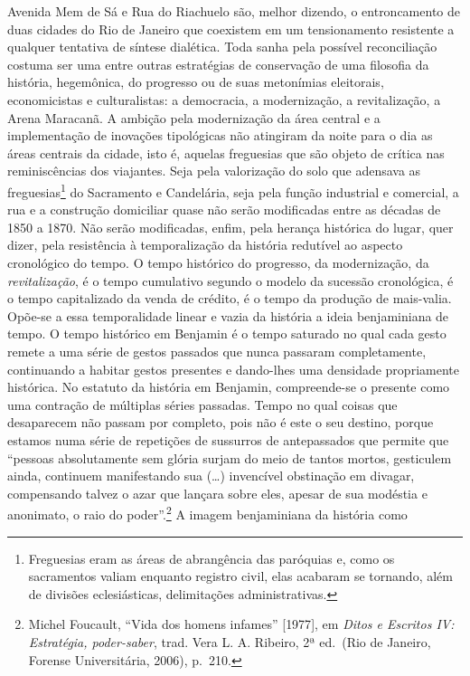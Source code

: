 Avenida Mem de Sá e Rua do Riachuelo são, melhor dizendo, o
entroncamento de duas cidades do Rio de Janeiro que coexistem em um
tensionamento resistente a qualquer tentativa de síntese dialética. Toda
sanha pela possível reconciliação costuma ser uma entre outras
estratégias de conservação de uma filosofia da história, hegemônica, do
progresso ou de suas metonímias eleitorais, economicistas e
culturalistas: a democracia, a modernização, a revitalização, a Arena
Maracanã. A ambição pela modernização da área central e a implementação
de inovações tipológicas não atingiram da noite para o dia as áreas
centrais da cidade, isto é, aquelas freguesias que são objeto de crítica
nas reminiscências dos viajantes. Seja pela valorização do solo que
adensava as freguesias\footnote{Freguesias eram as áreas de abrangência
  das paróquias e, como os sacramentos valiam enquanto registro civil,
  elas acabaram se tornando, além de divisões eclesiásticas,
  delimitações administrativas.} do Sacramento e Candelária, seja pela
função industrial e comercial, a rua e a construção domiciliar quase não
serão modificadas entre as décadas de 1850 a 1870. Não serão
modificadas, enfim, pela herança histórica do lugar, quer dizer, pela
resistência à temporalização da história redutível ao aspecto
cronológico do tempo. O tempo histórico do progresso, da modernização,
da \textit{revitalização}, é o tempo cumulativo segundo o modelo da
sucessão cronológica, é o tempo capitalizado da venda de crédito, é o
tempo da produção de mais-valia. Opõe-se a essa temporalidade linear e
vazia da história a ideia benjaminiana de tempo. O tempo histórico em
Benjamin é o tempo saturado no qual cada gesto remete a uma série de
gestos passados que nunca passaram completamente, continuando a habitar
gestos presentes e dando-lhes uma densidade propriamente histórica. No
estatuto da história em Benjamin, compreende-se o presente como uma
contração de múltiplas séries passadas. Tempo no qual coisas que
desaparecem não passam por completo, pois não é este o seu destino,
porque estamos numa série de repetições de sussurros de antepassados que
permite que ``pessoas absolutamente sem glória surjam do meio de tantos
mortos, gesticulem ainda, continuem manifestando sua (\ldots{})
invencível obstinação em divagar, compensando talvez o azar que lançara
sobre eles, apesar de sua modéstia e anonimato, o raio do
poder''.\footnote{Michel Foucault, ``Vida dos homens infames''
  {[}1977{]}, em \textit{Ditos e Escritos IV: Estratégia, poder-saber},
  trad. Vera L. A. Ribeiro, 2ª ed.~(Rio de Janeiro, Forense
  Universitária, 2006), p.~210.} A imagem benjaminiana da história como
